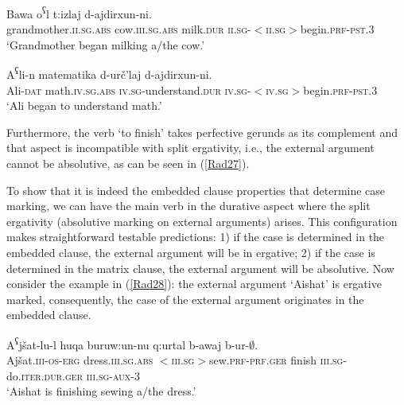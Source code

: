 \documentclass[output=paper]{langscibook}
\begin{document}
\ea\label{Rad24}
\gll Bawa o\textsuperscript{ʕ}l t:izlaj d-ajdirxun-ni.\\ 	
grandmother.\textsc{ii.sg.abs} cow.\textsc{iii.sg.abs} milk.\textsc{dur} \textsc{ii.sg-$<$ii.sg$>$}begin.\textsc{prf-pst.3}\\ 
\glt ‘Grandmother began milking a/the cow.’
\z



\ea\label{Rad25}

\gll A\textsuperscript{ʕ}li-n matematika d-urč’laj	d-ajdirxun-ni.\\
Ali-\textsc{dat} math.\textsc{iv.sg.abs} \textsc{iv.sg}-understand.\textsc{dur} \textsc{iv.sg-$<$iv.sg$>$}begin.\textsc{prf-pst.3}\\
\glt ‘Ali began to understand math.’
\z 


 Furthermore, the verb ‘to finish’ takes perfective gerunds as its complement and that aspect is incompatible with split ergativity, i.e., the external argument cannot be absolutive, as can be seen in (\ref{Rad27}). 
 \largerpage
 
\ea\label{Rad27}

\z 
\z 

To show that it is indeed the embedded clause properties that determine case marking, we can have the main verb in the durative aspect where the split ergativity (absolutive marking on external arguments) arises. This configuration makes straightforward testable predictions: 1) if the case is determined in the embedded clause, the external argument will be in ergative; 2) if the case is determined in the matrix clause, the external argument will be absolutive. Now consider the example in (\ref{Rad28}): the external argument ‘Aishat’ is ergative marked, consequently, the case of the external argument originates in the embedded clause.

\ea\label{Rad28}
\gll A\textsuperscript{ʕ}jšat-lu-l huqa buruw:un-nu q:urtal b-awaj	b-ur-$∅$.\\
Ajšat.\textsc{iii-os-erg} dress.\textsc{iii.sg.abs} \textsc{$<$iii.sg$>$}sew.\textsc{prf-prf.ger} finish \textsc{iii.sg}-do.\textsc{iter.dur.ger} \textsc{iii.sg-aux-3}\\
\glt ‘Aishat is finishing sewing a/the dress.’
\z 
\end{document}
